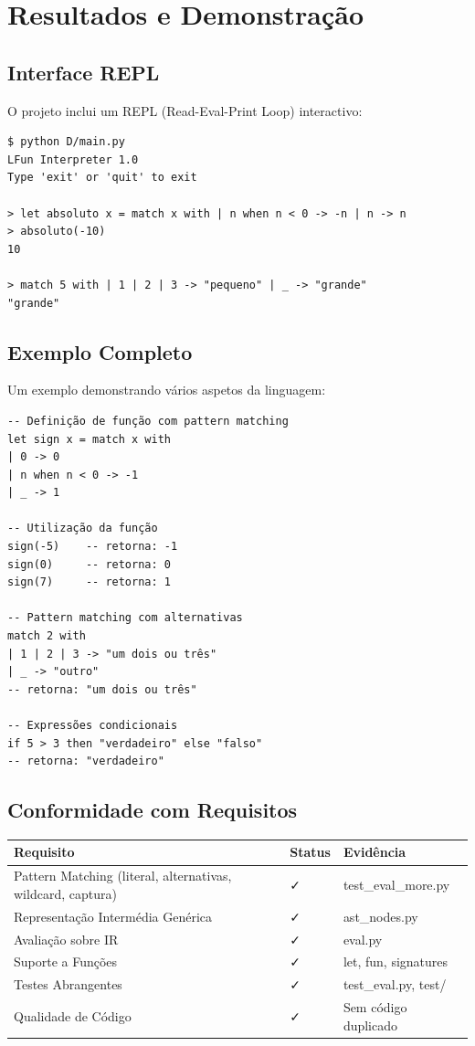 \documentclass[11pt,a4paper]{report}
\begin{document}
\chapter{Resultados e Demonstração}

\section{Interface REPL}

O projeto inclui um REPL (Read-Eval-Print Loop) interactivo:

\begin{lstlisting}
$ python D/main.py
LFun Interpreter 1.0
Type 'exit' or 'quit' to exit

> let absoluto x = match x with | n when n < 0 -> -n | n -> n
> absoluto(-10)
10

> match 5 with | 1 | 2 | 3 -> "pequeno" | _ -> "grande"
"grande"
\end{lstlisting}

\section{Exemplo Completo}

Um exemplo demonstrando vários aspetos da linguagem:

\begin{lstlisting}
-- Definição de função com pattern matching
let sign x = match x with
| 0 -> 0
| n when n < 0 -> -1
| _ -> 1

-- Utilização da função
sign(-5)    -- retorna: -1
sign(0)     -- retorna: 0
sign(7)     -- retorna: 1

-- Pattern matching com alternativas
match 2 with
| 1 | 2 | 3 -> "um dois ou três"
| _ -> "outro"
-- retorna: "um dois ou três"

-- Expressões condicionais
if 5 > 3 then "verdadeiro" else "falso"
-- retorna: "verdadeiro"
\end{lstlisting}

\section{Conformidade com Requisitos}

\begin{table}[H]
\centering
\begin{tabularx}{\textwidth}{|p{3cm}|p{2cm}|X|}
\hline
\textbf{Requisito} & \textbf{Status} & \textbf{Evidência} \\
\hline
Pattern Matching (literal, alternativas, wildcard, captura) & ✓ & test\_eval\_more.py \\
\hline
Representação Intermédia Genérica & ✓ & ast\_nodes.py \\
\hline
Avaliação sobre IR & ✓ & eval.py \\
\hline
Suporte a Funções & ✓ & let, fun, signatures \\
\hline
Testes Abrangentes & ✓ & test\_eval.py, test/ \\
\hline
Qualidade de Código & ✓ & Sem código duplicado \\
\hline
\end{tabularx}
\end{table}
\end{document}
